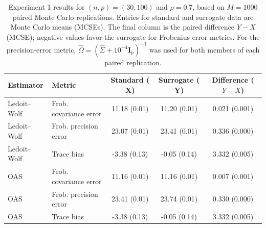 \begin{table}[htbp]
\centering
\small
\setlength{\tabcolsep}{4pt}
\caption{Experiment 1 results for $(n,p)=(30,100)$ and $\rho=0.7$, based on $M=1000$ paired Monte Carlo replications. Entries for standard and surrogate data are Monte Carlo means (MCSEs). The final column is the paired difference $Y-X$ (MCSE); negative values favor the surrogate for Frobenius-error metrics. For the precision-error metric, $\widehat{\Omega}=(\widehat{\Sigma}+10^{-4}\mathbf{I}_p)^{-1}$ was used for both members of each paired replication.}
\label{tab:exp1_results}
\begin{tabular}{llccc}
\hline\hline
\textbf{Estimator} & \textbf{Metric} & \textbf{Standard ($\mathbf{X}$)} & \textbf{Surrogate ($\mathbf{Y}$)} & \textbf{Difference ($Y-X$)} \\
\hline
Ledoit--Wolf & Frob. covariance error & 11.18 (0.01) & 11.20 (0.01) & 0.021 (0.001) \\
Ledoit--Wolf & Frob. precision error & 23.07 (0.01) & 23.41 (0.01) & 0.336 (0.000) \\
Ledoit--Wolf & Trace bias & -3.38 (0.13) & -0.05 (0.14) & 3.332 (0.005) \\
\hline
OAS & Frob. covariance error & 11.16 (0.01) & 11.16 (0.01) & 0.007 (0.001) \\
OAS & Frob. precision error & 23.41 (0.01) & 23.74 (0.01) & 0.330 (0.000) \\
OAS & Trace bias & -3.38 (0.13) & -0.05 (0.14) & 3.332 (0.005) \\
\hline\hline
\end{tabular}
\end{table}

